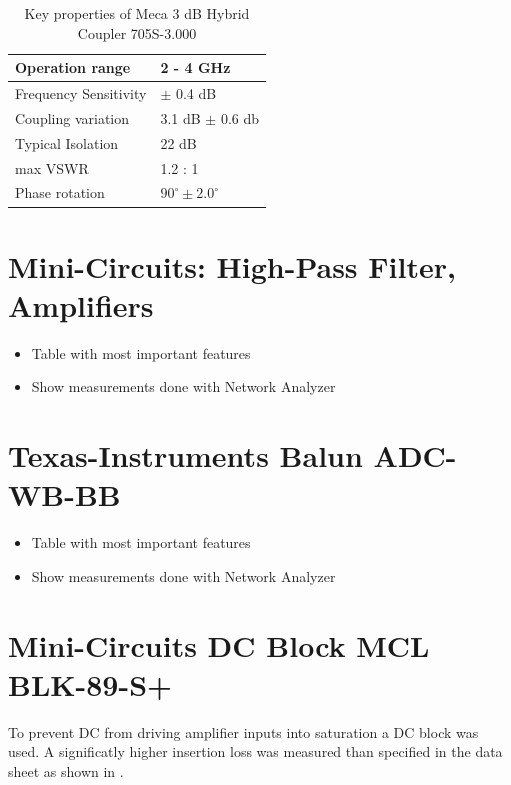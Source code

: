 \begin{table}[h]
  \centering
  \begin{tabular}{|l|l|}
    \hline
    Operation range & 2 - 4 GHz \\ \hline
    Frequency Sensitivity & $\pm$ 0.4 dB \\ \hline
    Coupling variation & 3.1 dB $\pm$ 0.6 db \\ \hline
    Typical Isolation & 22 dB \\ \hline
    max VSWR & 1.2 : 1 \\ \hline
    Phase rotation & $90^\circ \pm 2.0^\circ$ \\ \hline
  \end{tabular}
  \caption{Key properties of Meca 3 dB Hybrid Coupler 705S-3.000}
  \label{tab:awg}
\end{table}


\section{Mini-Circuits: High-Pass Filter, Amplifiers}
\begin{itemize}
\item Table with most important features
\item Show measurements done with Network Analyzer
\end{itemize}

\section{Texas-Instruments Balun ADC-WB-BB}
\begin{itemize}
\item Table with most important features
\item Show measurements done with Network Analyzer
\end{itemize}

\section{Mini-Circuits DC Block MCL BLK-89-S+}
\label{sec:comp_dc_block}
To prevent \acrshort{DC} from driving amplifier inputs into saturation
a \acrshort{DC} block was used. A significatly higher insertion loss was
measured than specified in the data sheet as shown in
.

